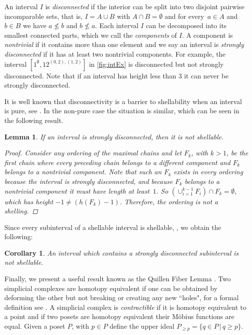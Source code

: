 \documentclass[preprint,11pt]{elsarticle}
\newtheorem{lem}[thm]{Lemma}\crefname{lem}{Lemma}{Lemmas}
\newtheorem{cor}[thm]{Corollary}\crefname{cor}{Corollary}{Corollaries}
\newcommand\h{h}
\numberwithin{equation}{section}
\numberwithin{figure}{section}
\numberwithin{thm}{section}
\begin{document}
An interval $I$ is \emph{disconnected} if the interior can be split into two disjoint pairwise incomparable sets,
that is, $I=A\cup B$ with $A\cap B=\emptyset$ and for every~$a\in A$
and $b\in B$ we have $a\not\le b$ and $b\not\le a$.
Each interval $I$ can be decomposed into its smallest connected parts, which we call the \emph{components} of $I$.
A component is \emph{nontrivial} if it contains more than one element
and we say an interval is \emph{strongly disconnected} if it has at least two nontrivial components.
For example, the interval $[1^\emptyset,12^{(0,2),(1,2)}]$ in \cref{fig:intEx} is disconnected
but not strongly disconnected. Note that if an interval has height less than $3$ it can
never be strongly disconnected.

It is well known that disconnectivity is a barrier to shellability when an interval is pure, see \cite{McSt13}. 
In the non-pure case the situation is similar, which can be seen in the following result.

\begin{lem}\label{lem:strongdis}
If an interval is strongly disconnected, then it is not shellable.
\begin{proof}
Consider any ordering of the maximal chains and let $F_k$, with ${k>1}$, be the first chain where
every preceding chain belongs to a different component and $F_k$ belongs to a
nontrivial component. Note that such an $F_k$ exists in every ordering because the interval
is strongly disconnected, and because $F_k$ belongs to a nontrivial component it must have length
at least~$1$. So $\left(\cup_{i=1}^{k-1}F_i\right)\cap F_k=\emptyset$,
which has height $-1\not=(\h(F_k)-1)$. Therefore, the ordering is not a
shelling.
\end{proof}
\end{lem}

Since every subinterval of a shellable interval is shellable, \cite[Corollary 3.1.9]{Wac07},
we obtain the following:

\begin{cor}
An interval which contains a strongly disconnected subinterval is not shellable.
\end{cor}

Finally, we present a useful result known as the Quillen Fiber Lemma \cite{Quillen78}. Two simplicial
complexes are homotopy equivalent  if one can be obtained by deforming the other but
not breaking or creating any new ``holes", for a formal definition see \cite{Hat02}.
A simplicial complex is \emph{contractible} if it is
homotopy equivalent to a point and if two posets are homotopy equivalent their
M\"obius functions are equal.  Given a poset $P$, with $p \in P$ define the upper
ideal $P_{\ge p}=\{q\in P\,|\,q\ge p\}$.
\end{document}
